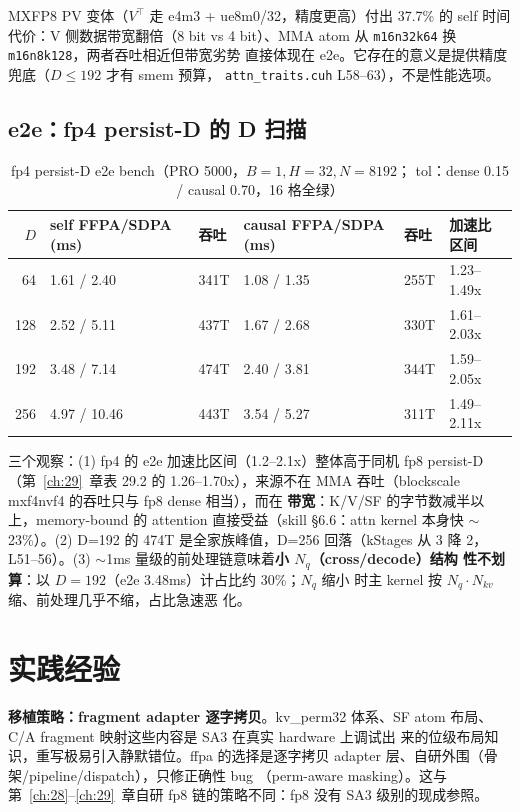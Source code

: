 MXFP8 PV 变体（$V^\top$ 走 e4m3 + ue8m0/32，精度更高）付出 37.7\%
的 self 时间代价：V 侧数据带宽翻倍（8 bit vs 4 bit）、MMA atom 从
\texttt{m16n32k64} 换 \texttt{m16n8k128}，两者吞吐相近但带宽劣势
直接体现在 e2e。它存在的意义是提供精度兜底（$D\le192$ 才有 smem 预算，
\texttt{attn\_traits.cuh} L58--63），不是性能选项。

\subsection{e2e：fp4 persist-D 的 D 扫描}

\begin{table}[H]
  \centering
  \caption{fp4 persist-D e2e bench（PRO 5000，$B{=}1,H{=}32,N{=}8192$；
  tol：dense 0.15 / causal 0.70，16 格全绿）}
  \label{tab:31-bench}
  \begin{tabular}{@{}rlllll@{}}
    \toprule
    $D$ & self FFPA/SDPA (ms) & 吞吐 & causal FFPA/SDPA (ms) & 吞吐 & 加速比区间 \\
    \midrule
    64  & 1.61 / 2.40 & 341T & 1.08 / 1.35 & 255T & 1.23--1.49x \\
    128 & 2.52 / 5.11 & 437T & 1.67 / 2.68 & 330T & 1.61--2.03x \\
    192 & 3.48 / 7.14 & 474T & 2.40 / 3.81 & 344T & 1.59--2.05x \\
    256 & 4.97 / 10.46 & 443T & 3.54 / 5.27 & 311T & 1.49--2.11x \\
    \bottomrule
  \end{tabular}
\end{table}

三个观察：(1) fp4 的 e2e 加速比区间（1.2--2.1x）整体高于同机 fp8
persist-D（第~\ref{ch:29}~章表 29.2 的 1.26--1.70x），来源不在 MMA
吞吐（blockscale mxf4nvf4 的吞吐只与 fp8 dense 相当），而在
\textbf{带宽}：K/V/SF 的字节数减半以上，memory-bound 的 attention
直接受益（skill §6.6：attn kernel 本身快 $\sim$23\%）。(2) D=192 的
474T 是全家族峰值，D=256 回落（kStages 从 3 降 2，L51--56）。(3)
$\sim$1ms 量级的前处理链意味着\textbf{小 $N_q$（cross/decode）结构
性不划算}：以 $D{=}192$（e2e 3.48ms）计占比约 30\%；$N_q$ 缩小
时主 kernel 按 $N_q\cdot N_{kv}$ 缩、前处理几乎不缩，占比急速恶
化。

\section{实践经验}

\textbf{移植策略：fragment adapter 逐字拷贝}。kv\_perm32 体系、SF
atom 布局、C/A fragment 映射这些内容是 SA3 在真实 hardware 上调试出
来的位级布局知识，重写极易引入静默错位。ffpa 的选择是逐字拷贝
adapter 层、自研外围（骨架/pipeline/dispatch），只修正确性 bug
（perm-aware masking）。这与第~\ref{ch:28}--\ref{ch:29}~章自研 fp8
链的策略不同：fp8 没有 SA3 级别的现成参照。


